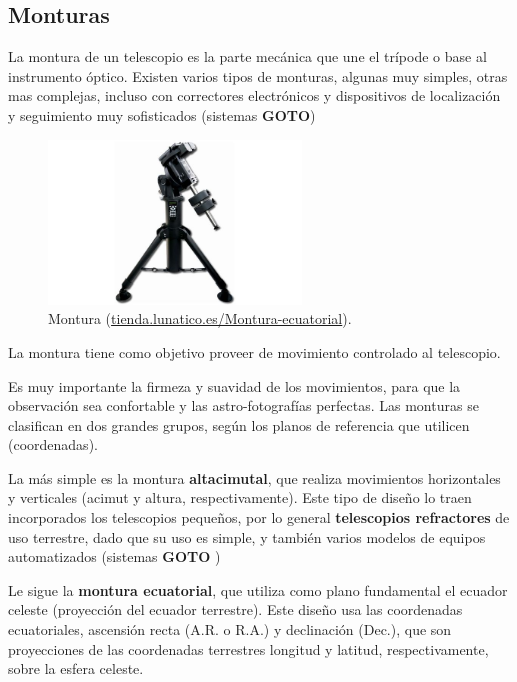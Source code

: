 \subsection{Monturas}

La montura de un telescopio es la parte mecánica que une el trípode o base al instrumento óptico. Existen varios tipos de monturas, algunas muy simples, otras mas complejas, incluso con correctores electrónicos y dispositivos de localización y seguimiento muy sofisticados (sistemas \textbf{GOTO})

\bigskip
\begin{figure}[!ht]
	\begin{center}
		\includegraphics[width=0.6\textwidth]{../images/montura.jpg}
		\caption[Montura]{Montura (\href{http://tienda.lunatico.es/Montura-ecuatorial-SkyWatcher-EQ-8-con-tripod}{tienda.lunatico.es/Montura-ecuatorial}).}
		\label{fig:montura}
	\end{center}
\end{figure}

\bigskip
La montura tiene como objetivo proveer de movimiento controlado al telescopio.

\bigskip
Es muy importante la firmeza y suavidad de los movimientos, para que la observación sea confortable y las astro-fotografías perfectas. Las monturas se clasifican en dos grandes grupos, según los planos de referencia que utilicen (coordenadas).

\bigskip
La más simple es la montura \textbf{altacimutal}, que realiza movimientos horizontales y verticales (acimut y altura, respectivamente). Este tipo de diseño lo traen incorporados los telescopios pequeños, por lo general \textbf{telescopios refractores} de uso terrestre, dado que su uso es simple, y también varios modelos de equipos automatizados (sistemas \textbf{GOTO} )

\bigskip
Le sigue la \textbf{montura ecuatorial}, que utiliza como plano fundamental el ecuador celeste (proyección del ecuador terrestre). Este diseño usa las coordenadas ecuatoriales, ascensión recta (A.R. o R.A.) y declinación (Dec.), que son proyecciones de las coordenadas terrestres longitud y latitud, respectivamente, sobre la esfera celeste.


